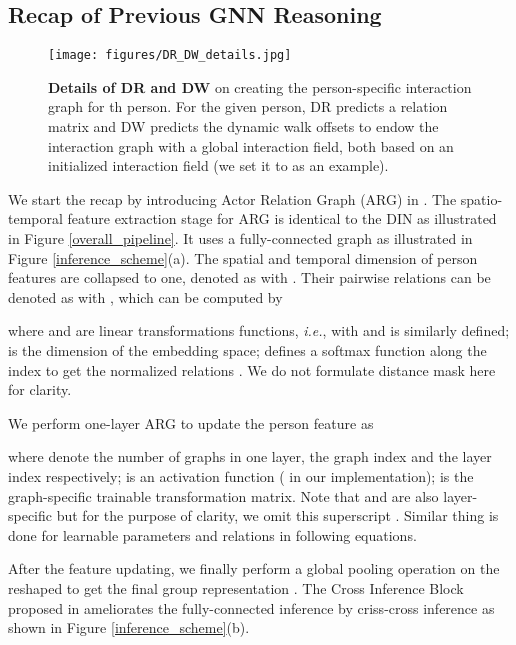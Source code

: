 \documentclass[10pt,twocolumn,letterpaper]{article}
\begin{document}
\subsection{Recap of Previous GNN Reasoning} \label{recap}

\begin{figure*}[t]
\centering
\texttt{[image: figures/DR\_DW\_details.jpg]} 
\caption{\textbf{Details of DR and DW} on creating the person-specific interaction graph for th person. For the given person, DR predicts a relation matrix and DW predicts the dynamic walk offsets to endow the interaction graph with a global interaction field, both based on an initialized interaction field (we set it to  as an example).}
\label{DR_DW_details}
\vspace{-0.4cm}
\end{figure*}



We start the recap by introducing Actor Relation Graph (ARG) in \cite{wu2019learning}. The spatio-temporal feature extraction stage for ARG is identical to the DIN as illustrated in Figure \ref{overall_pipeline}. It uses a fully-connected graph as illustrated in Figure \ref{inference_scheme}(a). The spatial and temporal dimension of person features  are collapsed to one, denoted as  with . Their pairwise relations can be denoted as  with , which can be computed by

\vspace{-0.2cm}

where  and  are linear transformations functions, \textit{i.e.},  with  and  is similarly defined;  is the dimension of the embedding space;  defines a softmax function along the index  to get the normalized relations . We do not formulate distance mask here for clarity.


We perform one-layer ARG to update the person feature as 

where  denote the number of graphs in one layer, the graph index and the layer index respectively;  is an activation function ( in our implementation);  is the graph-specific trainable transformation matrix. Note that  and  are also layer-specific but for the purpose of clarity, we omit this superscript . Similar thing is done for learnable parameters and relations in following equations.

After the feature updating, we finally perform a global pooling operation on the reshaped  to get the final group representation . The Cross Inference Block proposed in \cite{yan2020higcin} ameliorates the fully-connected inference by criss-cross inference as shown in Figure \ref{inference_scheme}(b).
\end{document}
